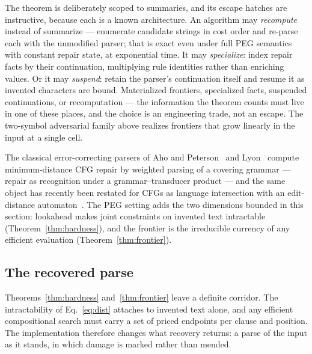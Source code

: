 \documentclass[manuscript]{acmart}
\begin{document}
The theorem is deliberately scoped to summaries, and its escape hatches are instructive, because each is a known architecture. An algorithm may \emph{recompute} instead of summarize --- enumerate candidate strings in cost order and re-parse each with the unmodified parser; that is exact even under full PEG semantics with constant repair state, at exponential time. It may \emph{specialize}: index repair facts by their continuation, multiplying rule identities rather than enriching values. Or it may \emph{suspend}: retain the parser's continuation itself and resume it as invented characters are bound. Materialized frontiers, specialized facts, suspended continuations, or recomputation --- the information the theorem counts must live in one of these places, and the choice is an engineering trade, not an escape. The two-symbol adversarial family above realizes frontiers that grow linearly in the input at a single cell.

The classical error-correcting parsers of Aho and Peterson~\cite{aho1972} and Lyon~\cite{lyon1974} compute minimum-distance CFG repair by weighted parsing of a covering grammar --- repair as recognition under a grammar--transducer product --- and the same object has recently been restated for CFGs as language intersection with an edit-distance automaton~\cite{considine2025}. The PEG setting adds the two dimensions bounded in this section: lookahead makes joint constraints on invented text intractable (Theorem~\ref{thm:hardness}), and the frontier is the irreducible currency of any efficient evaluation (Theorem~\ref{thm:frontier}).

\subsection{The recovered parse}
\label{sec:contract}

Theorems~\ref{thm:hardness} and~\ref{thm:frontier} leave a definite corridor. The intractability of Eq.~\ref{eq:dist} attaches to invented text alone, and any efficient compositional search must carry a set of priced endpoints per clause and position. The implementation therefore changes what recovery returns: a parse of the input as it stands, in which damage is marked rather than mended.
\end{document}
